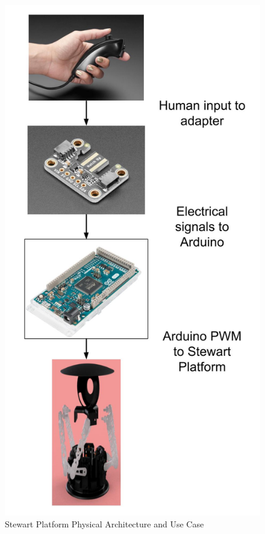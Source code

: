 \documentclass[a4paper, 10pt]{article}
\begin{document}
		\begin{figure} [!h]
			\centering
			\includegraphics[scale=0.35]{Photos/Stewart Platform Physical Architecture.jpg}
			\caption{Stewart Platform Physical Architecture and Use Case}
			\label{Stewart Physical}
		\end{figure}
		
\end{document}
